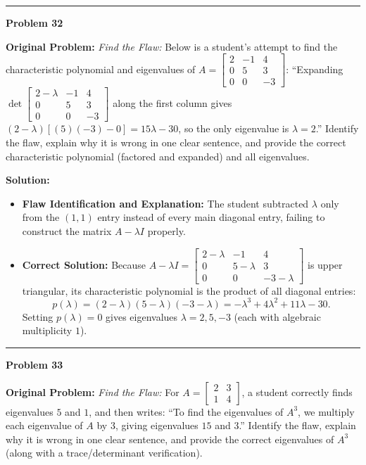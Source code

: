 \documentclass[11pt, letterpaper]{article}
\theoremstyle{definition}
\theoremstyle{remark}
\begin{document}
\noindent\rule{\textwidth}{0.4pt}

\noindent\textbf{Problem 32}

\textbf{Original Problem:} \textit{Find the Flaw:} Below is a student's attempt to find the characteristic polynomial and eigenvalues of $A = \begin{bmatrix} 2 & -1 & 4 \\ 0 & 5 & 3 \\ 0 & 0 & -3 \end{bmatrix}$: ``Expanding $\det\begin{bmatrix} 2 - \lambda & -1 & 4 \\ 0 & 5 & 3 \\ 0 & 0 & -3 \end{bmatrix}$ along the first column gives $(2 - \lambda)[(5)(-3) - 0] = 15\lambda - 30$, so the only eigenvalue is $\lambda = 2$.'' Identify the flaw, explain why it is wrong in one clear sentence, and provide the correct characteristic polynomial (factored and expanded) and all eigenvalues.

\textbf{Solution:}
\begin{itemize}[topsep=3pt, itemsep=3pt]
    \item \textbf{Flaw Identification and Explanation:} The student subtracted $\lambda$ only from the $(1, 1)$ entry instead of every main diagonal entry, failing to construct the matrix $A - \lambda I$ properly.
    \item \textbf{Correct Solution:} Because $A - \lambda I = \begin{bmatrix} 2 - \lambda & -1 & 4 \\ 0 & 5 - \lambda & 3 \\ 0 & 0 & -3 - \lambda \end{bmatrix}$ is upper triangular, its characteristic polynomial is the product of all diagonal entries:
    \[
    p(\lambda) = (2 - \lambda)(5 - \lambda)(-3 - \lambda) = -\lambda^3 + 4\lambda^2 + 11\lambda - 30.
    \]
    Setting $p(\lambda) = 0$ gives eigenvalues $\lambda = 2, 5, -3$ (each with algebraic multiplicity $1$).
\end{itemize}

\noindent\rule{\textwidth}{0.4pt}

\noindent\textbf{Problem 33}

\textbf{Original Problem:} \textit{Find the Flaw:} For $A = \begin{bmatrix} 2 & 3 \\ 1 & 4 \end{bmatrix}$, a student correctly finds eigenvalues $5$ and $1$, and then writes: ``To find the eigenvalues of $A^3$, we multiply each eigenvalue of $A$ by $3$, giving eigenvalues $15$ and $3$.'' Identify the flaw, explain why it is wrong in one clear sentence, and provide the correct eigenvalues of $A^3$ (along with a trace/determinant verification).
\end{document}
